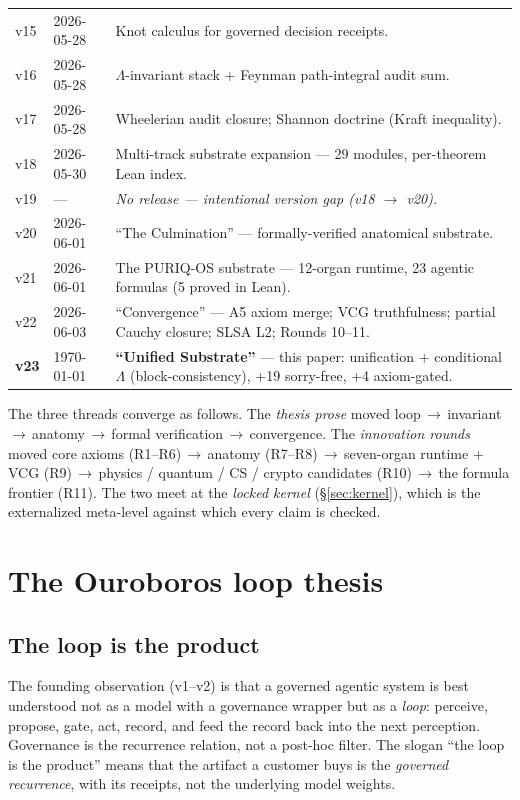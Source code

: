 \documentclass[11pt]{article}
\theoremstyle{plain}
\theoremstyle{definition}
\theoremstyle{remark}
\newcommand{\La}{\Lambda}
\begin{document}
\begin{longtable}{@{}p{}p{}p{}@{}}
v15 & 2026-05-28 & Knot calculus for governed decision receipts. \\
v16 & 2026-05-28 & $\La$-invariant stack + Feynman path-integral audit sum. \\
v17 & 2026-05-28 & Wheelerian audit closure; Shannon doctrine (Kraft inequality). \\
v18 & 2026-05-30 & Multi-track substrate expansion --- 29 modules, per-theorem Lean index. \\
v19 & --- & \emph{No release --- intentional version gap (v18 $\to$ v20).} \\
v20 & 2026-06-01 & ``The Culmination'' --- formally-verified anatomical substrate. \\
v21 & 2026-06-01 & The PURIQ-OS substrate --- 12-organ runtime, 23 agentic formulas (5 proved in Lean). \\
v22 & 2026-06-03 & ``Convergence'' --- A5 axiom merge; VCG truthfulness; partial Cauchy closure; SLSA L2; Rounds 10--11. \\
\textbf{v23} & \today & \textbf{``Unified Substrate''} --- this paper: unification + conditional $\La$ (block-consistency), +19 sorry-free, +4 axiom-gated. \\
\bottomrule
\end{longtable}

\noindent The three threads converge as follows. The \emph{thesis prose} moved
loop\,$\to$\,invariant\,$\to$\,anatomy\,$\to$\,formal verification\,$\to$\,convergence.
The \emph{innovation rounds} moved core axioms (R1--R6)\,$\to$\,anatomy (R7--R8)\,$\to$\,seven-organ
runtime + VCG (R9)\,$\to$\,physics / quantum / CS / crypto candidates (R10)\,$\to$\,the
formula frontier (R11). The two meet at the \emph{locked kernel} (\S\ref{sec:kernel}),
which is the externalized meta-level against which every claim is checked.

\section{The Ouroboros loop thesis}
\label{sec:loop}

\subsection{The loop is the product}
The founding observation (v1--v2) is that a governed agentic system is best
understood not as a model with a governance wrapper but as a \emph{loop}: perceive,
propose, gate, act, record, and feed the record back into the next perception.
Governance is the recurrence relation, not a post-hoc filter. The slogan ``the loop
is the product'' means that the artifact a customer buys is the \emph{governed
recurrence}, with its receipts, not the underlying model weights.
\end{document}
